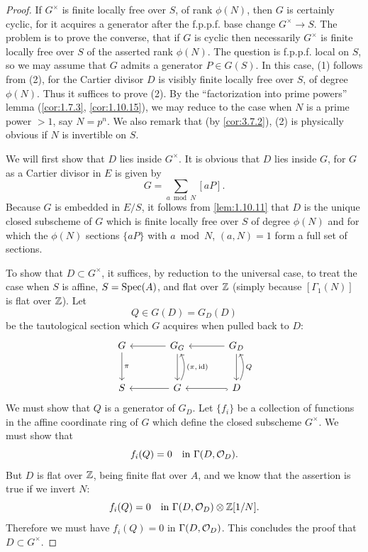 \begin{proof}
If $G^\times$ is finite locally free over $S$, of rank $\phi(N)$, then $G$ is certainly cyclic, for it acquires a generator after the f.p.p.f. base change $G^\times \to S$. The problem is to prove the converse, that if $G$ is cyclic then necessarily $G^\times$ is finite locally free over $S$ of the asserted rank $\phi(N)$. The question is f.p.p.f. local on $S$, so we may assume that $G$ admits a generator $P \in G(S)$. In this case, (1) follows from (2), for the Cartier divisor $D$ is visibly finite locally free over $S$, of degree $\phi(N)$. Thus it suffices to prove (2). By the ``factorization into prime powers'' lemma (\ref{cor:1.7.3}, \ref{cor:1.10.15}), we may reduce to the case when $N$ is a prime power $> 1$, say $N = p^n$. We also remark that (by \ref{cor:3.7.2}), (2) is physically obvious if $N$ is invertible on $S$.

We will first show that $D$ lies inside $G^\times$. It is obvious that $D$ lies inside $G$, for $G$ as a Cartier divisor in $E$ is given by
\[
G = \sum_{a \bmod N} [aP].
\]
Because $G$ is embedded in $E/S$, it follows from \ref{lem:1.10.11} that $D$ is the unique closed subscheme of $G$ which is finite locally free over $S$ of degree $\phi(N)$ and for which the $\phi(N)$ sections $\{aP\}$ with $a \bmod N$, $(a,N) = 1$ form a full set of sections.

To show that $D \subset G^\times$, it suffices, by reduction to the universal case, to treat the case when $S$ is affine, $S = \operatorname{Spec}(A)$, and flat over $\mathbb{Z}$ (simply because $[\Gamma_1(N)]$ is flat over $\mathbb{Z}$). Let
\[
Q \in G(D) = G_D(D)
\]
be the tautological section which $G$ acquires when pulled back to $D$:
\[
\begin{tikzcd}[row sep=large, column sep=large, every label/.append style={font=\scriptsize}]
G & G_G & G_D \\
S & G & D
\arrow[from=1-2, to=1-1]
\arrow[from=1-3, to=1-2]
\arrow[from=1-1, to=2-1, "\pi"]
\arrow[from=1-2, to=2-2]
\arrow[from=2-2, to=1-2, bend right=25, "{(\pi,\mathrm{id})}"']
\arrow[from=1-3, to=2-3]
\arrow[from=2-3, to=1-3, bend right=25, "Q"']
\arrow[from=2-2, to=2-1]
\arrow[from=2-3, to=2-2, hook]
\end{tikzcd}
\]
We must show that $Q$ is a generator of $G_D$. Let $\{f_i\}$ be a collection of functions in the affine coordinate ring of $G$ which define the closed subscheme $G^\times$. We must show that
\[
f_i(Q) = 0 \quad \text{in } \Gamma(D,\mathcal{O}_D).
\]
But $D$ is flat over $\mathbb{Z}$, being finite flat over $A$, and we know that the assertion is true if we invert $N$:
\[
f_i(Q) = 0 \quad \text{in } \Gamma(D,\mathcal{O}_D) \otimes \mathbb{Z}[1/N].
\]
Therefore we must have $f_i(Q) = 0$ in $\Gamma(D,\mathcal{O}_D)$. This concludes the proof that $D \subset G^\times$.


\end{proof}
